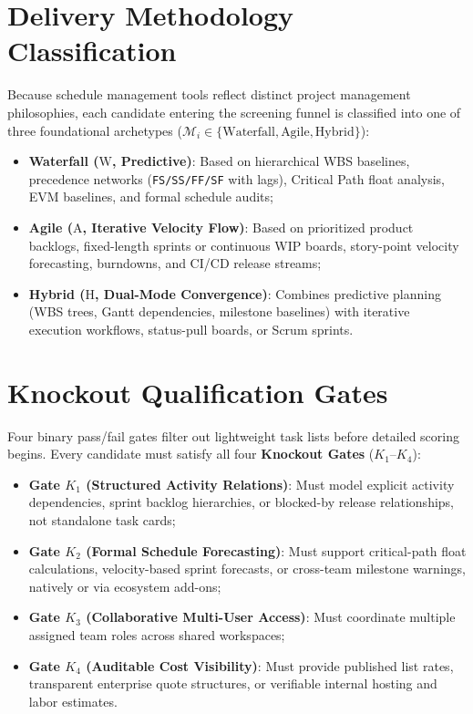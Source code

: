 \section{Delivery Methodology Classification}
Because schedule management tools reflect distinct project management philosophies, each candidate entering the screening funnel is classified into one of three foundational archetypes ($\mathcal{M}_i \in \{\text{Waterfall}, \text{Agile}, \text{Hybrid}\}$):
\begin{itemize}[itemsep=1pt,topsep=1pt]
	\item \textbf{Waterfall ($\text{W}$, Predictive)}: Based on hierarchical WBS baselines, precedence networks (\texttt{FS/SS/FF/SF} with lags), Critical Path float analysis, EVM baselines, and formal schedule audits;
	\item \textbf{Agile ($\text{A}$, Iterative Velocity Flow)}: Based on prioritized product backlogs, fixed-length sprints or continuous WIP boards, story-point velocity forecasting, burndowns, and CI/CD release streams;
	\item \textbf{Hybrid ($\text{H}$, Dual-Mode Convergence)}: Combines predictive planning (WBS trees, Gantt dependencies, milestone baselines) with iterative execution workflows, status-pull boards, or Scrum sprints.
\end{itemize}

\vspace{4mm}

\section{Knockout Qualification Gates}
Four binary pass/fail gates filter out lightweight task lists before detailed scoring begins. Every candidate must satisfy all four \textbf{Knockout Gates} ($K_1$--$K_4$):
\begin{itemize}[itemsep=1pt,topsep=1pt]
    \item \textbf{Gate $K_1$ (Structured Activity Relations)}: Must model explicit activity dependencies, sprint backlog hierarchies, or blocked-by release relationships, not standalone task cards;
    \item \textbf{Gate $K_2$ (Formal Schedule Forecasting)}: Must support critical-path float calculations, velocity-based sprint forecasts, or cross-team milestone warnings, natively or via ecosystem add-ons;
    \item \textbf{Gate $K_3$ (Collaborative Multi-User Access)}: Must coordinate multiple assigned team roles across shared workspaces;
    \item \textbf{Gate $K_4$ (Auditable Cost Visibility)}: Must provide published list rates, transparent enterprise quote structures, or verifiable internal hosting and labor estimates.
\end{itemize}

